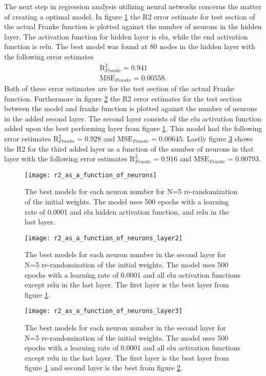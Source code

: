 \documentclass[uio,jmp,amsmath,amssymb,reprint,nofootinbib]{revtex4-1}
\numberwithin{equation}{section}
\begin{document}
The next step in regression analysis utilizing neural networks concerns the matter of creating a optimal model. In figure \ref{fig:13} the R2 error estimate for test section of the actual Franke function is plotted against the number of neurons in the hidden layer. The activation function for hidden layer is elu, while the end activation function is relu. The best model was found at 80 nodes in the hidden layer with the following error estimates
\begin{align}
\text{R}^2_{Franke} = 0.941\\
\text{MSE}_{Franke} = 0.00558.
\end{align}
Both of these error estimates are for the test section of the actual Franke function. Furthermore in figure \ref{fig:14} the R2 error estimates for the test section between the model and franke function is plotted against the number of neurons in the added second layer. The second layer consists of the elu activation function added upon the best performing layer from figure \ref{fig:13}. This model had the following error estimates \(\text{R}^2_{Franke} = 0.928\) and \(\text{MSE}_{Franke} = 0.00645\). Lastly figure \ref{fig:15} shows the R2 for the third added layer as a function of the number of neurons in that layer with the following error estimates \(\text{R}^2_{Franke} = 0.916\) and \(\text{MSE}_{Franke} = 0.00793\).

\begin{figure}[H]
    \centering
    \texttt{[image: r2\_as\_a\_function\_of\_neurons]}
    \caption{The best models for each neuron number for N=5 re-randomization of the initial weights. The model uses 500 epochs with a learning rate of 0.0001 and elu hidden activation function, and relu in the last layer.}
    \label{fig:13}
\end{figure}

\begin{figure}[H]
    \centering
    \texttt{[image: r2\_as\_a\_function\_of\_neurons\_layer2]}
    \caption{The best models for each neuron number in the second layer for N=5 re-randomization of the initial weights. The model uses 500 epochs with a learning rate of 0.0001 and all elu activation functions except relu in the last layer. The first layer is the best layer from figure \ref{fig:13}.}
    \label{fig:14}
\end{figure}

\begin{figure}[H]
    \centering
    \texttt{[image: r2\_as\_a\_function\_of\_neurons\_layer3]}
    \caption{The best models for each neuron number in the second layer for N=5 re-randomization of the initial weights. The model uses 500 epochs with a learning rate of 0.0001 and all elu activation functions except relu in the last layer. The first layer is the best layer from figure \ref{fig:13} and second layer is the best from figure \ref{fig:14}.}
    \label{fig:15}
\end{figure}
\end{document}

